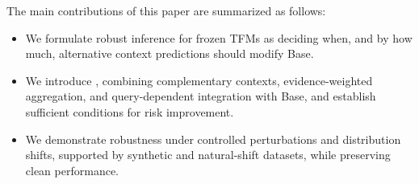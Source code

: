 The main contributions of this paper are summarized as follows:
\begin{itemize}
    \item We formulate robust inference for frozen TFMs as deciding when, and
    by how much, alternative context predictions should modify Base.
    \item We introduce \method{}, combining complementary contexts,
    evidence-weighted aggregation, and query-dependent integration with Base,
    and establish sufficient conditions for risk improvement.
    \item We demonstrate robustness under controlled perturbations and
    distribution shifts, supported by synthetic and natural-shift datasets,
    while preserving clean performance.
\end{itemize}
\FloatBarrier
